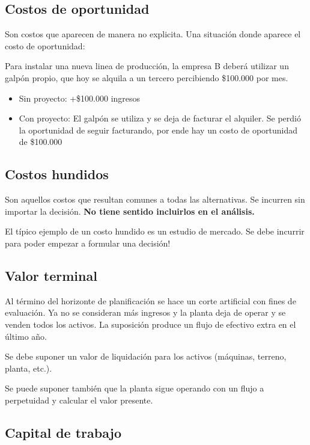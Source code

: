 \documentclass[twocolumn,10pt]{article}
\begin{document}
\subsection{Costos de oportunidad}

Son costos que aparecen de manera no explicita. Una situación donde aparece el costo de oportunidad:

Para instalar una nueva linea de producción, la empresa B deberá utilizar un galpón propio, que hoy se alquila a un tercero percibiendo \$100.000 por mes.

\begin{itemize}
	\item Sin proyecto: +\$100.000 ingresos
	\item Con proyecto: El galpón se utiliza y se deja de facturar el alquiler. Se perdió la oportunidad de seguir facturando, por ende hay un costo de oportunidad de \$100.000
\end{itemize}

\subsection{Costos hundidos}

Son aquellos costos que resultan comunes a todas las alternativas. Se incurren sin importar la decisión. \textbf{No tiene sentido incluirlos en el análisis.}

El típico ejemplo de un costo hundido es un estudio de mercado. Se debe incurrir para poder empezar a formular una decisión!

\subsection{Valor terminal}
Al término del horizonte de planificación se hace un corte artificial con fines de evaluación. Ya no se consideran más ingresos y la planta deja de operar y se venden todos los activos. La suposición produce un flujo de efectivo extra en el último año.

Se debe suponer un valor de liquidación para los activos (máquinas, terreno, planta, etc.).

Se puede suponer también que la planta sigue operando con un flujo a perpetuidad y calcular el valor presente.

\subsection{Capital de trabajo}
\end{document}
